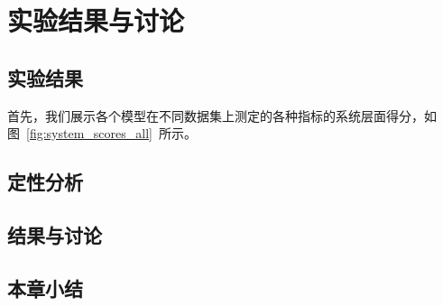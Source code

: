 
\chapter{实验结果与讨论}\label{ch:experiment}

\section{实验结果}\label{sec:experiment_result}
首先，我们展示各个模型在不同数据集上测定的各种指标的系统层面得分，如图~\ref{fig:system_scores_all}~所示。


\section{定性分析}\label{sec:qualitative_analysis}

\section{结果与讨论}\label{sec:result_and_discussion}

\section{本章小结}\label{sec:experiment_conclusion}

